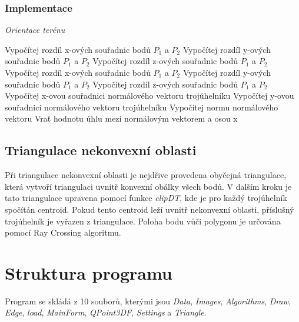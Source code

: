 \documentclass{article}
\begin{document}
\begin{spacing}{1.5}
\subsubsection*{Implementace}
\begin{algorithm}[h]
    \caption {\textit{Orientace terénu}}
    \begin{algorithmic}[1]
        \State Vypočítej rozdíl x-ových souřadnic bodů $P_1$ a $P_2$
        \State Vypočítej rozdíl y-ových souřadnic bodů $P_1$ a $P_2$
        \State Vypočítej rozdíl z-ových souřadnic bodů $P_1$ a $P_2$
        \State Vypočítej rozdíl x-ových souřadnic bodů $P_1$ a $P_2$
        \State Vypočítej rozdíl y-ových souřadnic bodů $P_1$ a $P_2$
        \State Vypočítej rozdíl z-ových souřadnic bodů $P_1$ a $P_2$
        \State Vypočítej x-ovou souřadnici normálového vektoru trojúhelníku
        \State Vypočítej y-ovou souřadnici normálového vektoru trojúhelníku
        \State Vypočítej normu normálového vektoru
        \State Vrať hodnotu úhlu mezi normálovým vektorem a osou x
    \end{algorithmic}
\end{algorithm}

\subsection{Triangulace nekonvexní oblasti}
Při triangulace nekonvexní oblasti je nejdřive provedena obyčejná triangulace, která vytvoří triangulaci uvnitř konvexní obálky všech bodů. V dalším kroku je tato triangulace upravena pomocí funkce \textit{clipDT}, kde je pro každý trojúhelník spočítán centroid. Pokud tento centroid leží uvnitř nekonvexní oblasti, příslušný trojúhelník je  vyřazen  z triangulace. Poloha bodu vůči polygonu je určována pomocí Ray Crossing algoritmu.

\section{Struktura programu}
Program se skládá z 10 souborů, kterými jsou \textit{Data}, \textit{Images}, \textit{Algorithms}, \textit{Draw}, \textit{Edge}, \textit{load},\textit{ MainForm}, \textit{QPoint3DF}, \textit{Settings} a \textit{Triangle}.


\end{spacing}
\end{document}
